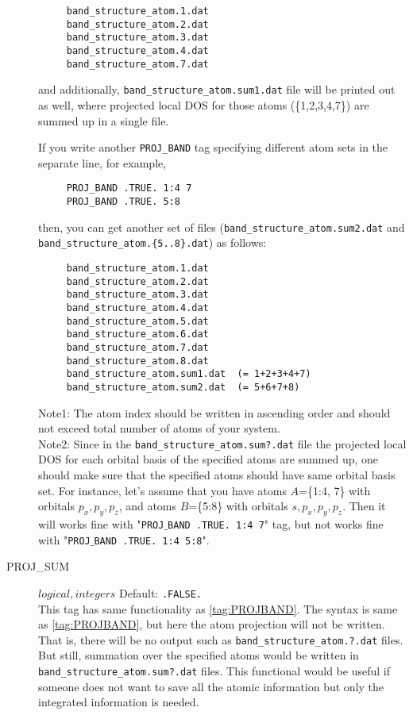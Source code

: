 \documentclass[a4paper,12pt]{scrartcl}
\makeatletter
\def\namedlabel#1#2{\begingroup
    #2%
    \def\@currentlabel{#2}%
    \phantomsection\label{#1}\endgroup
}
\makeatother
\begin{document}
\begin{description}
        \begin{verbatim}
     band_structure_atom.1.dat
     band_structure_atom.2.dat
     band_structure_atom.3.dat
     band_structure_atom.4.dat
     band_structure_atom.7.dat
    \end{verbatim} 
    and additionally, \texttt{band\_structure\_atom.sum1.dat}     
    file will be printed out as well, where projected local DOS for those atoms (\{1,2,3,4,7\}) are summed up in a single file.
    
    If you write another \texttt{PROJ\_BAND} tag specifying different atom sets in the separate line,
    for example, 
    
    \begin{verbatim}
     PROJ_BAND .TRUE. 1:4 7
     PROJ_BAND .TRUE. 5:8
    \end{verbatim}
    
    then, you can get another set of files (\texttt{band\_structure\_atom.sum2.dat} and \\
    \texttt{band\_structure\_atom.\{5..8\}.dat}) as follows:
    \begin{verbatim}
     band_structure_atom.1.dat
     band_structure_atom.2.dat
     band_structure_atom.3.dat
     band_structure_atom.4.dat
     band_structure_atom.5.dat
     band_structure_atom.6.dat
     band_structure_atom.7.dat
     band_structure_atom.8.dat
     band_structure_atom.sum1.dat  (= 1+2+3+4+7) 
     band_structure_atom.sum2.dat  (= 5+6+7+8)
    \end{verbatim} 
       
    Note1: The atom index should be written in ascending order
    and should not exceed total number of atoms of your system. \\
    Note2: Since in the \texttt{band\_structure\_atom.sum?.dat} file 
    the projected local DOS for each orbital basis of the specified atoms are 
    summed up, one should make sure that the specified atoms should have same orbital basis set. For instance, let's assume that you have atoms $A$=\{1:4, 7\} with orbitals $p_x, p_y, p_z$, and atoms $B$=\{5:8\} with orbitals $s, p_x, p_y, p_z$. Then it will works fine with "\texttt{PROJ$\_$BAND .TRUE. 1:4 7}" tag, but not works fine with 
        "\texttt{PROJ$\_$BAND .TRUE. 1:4 5:8}".
     
    \item[\namedlabel{tag:PROSUM}{PROJ\_SUM}] $logical, integers$ Default: \texttt{.FALSE.} \\
		This tag has same functionality as \ref{tag:PROJBAND}. The syntax is same as  \ref{tag:PROJBAND}, but here the atom projection will not be written. That is, there will be no output such as \texttt{band\_structure\_atom.?.dat} files. But still, summation over the specified atoms would be written  in \texttt{band\_structure\_atom.sum?.dat} files. This functional would be useful if someone does not want to save all the atomic information but only the integrated information is needed.
      

\end{description}
\end{document}
